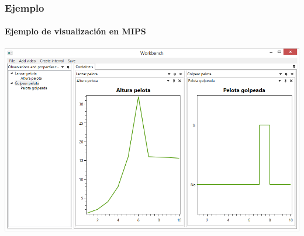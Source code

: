 \begin{frame}
	\frametitle{Ejemplo}
	\framesubtitle{Ejemplo de visualizaci\'on en MIPS}
	\begin{center}
		\includegraphics[width=1.0\linewidth]{./Figures/EjemploObservacion.PNG}
	\end{center}
\end{frame}